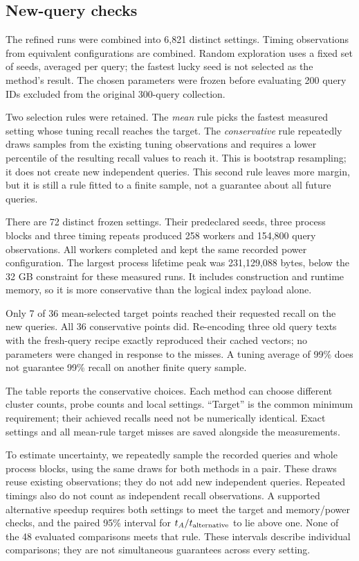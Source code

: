\subsection{New-query checks}
The refined runs were combined into 6,821 distinct settings. Timing observations from equivalent configurations are combined. Random exploration uses a fixed set of seeds, averaged per query;
the fastest lucky seed is not selected as the method's result. The chosen parameters were
frozen before evaluating 200 query IDs excluded from the original 300-query collection.

Two selection rules were retained. The \emph{mean} rule picks the fastest measured setting whose
tuning recall reaches the target. The \emph{conservative} rule repeatedly draws samples from the existing tuning observations
and requires a lower percentile of the resulting recall values to reach it. This is bootstrap
resampling; it does not create new independent queries. This second rule leaves more margin, but it is still
a rule fitted to a finite sample, not a guarantee about all future queries.

There are 72 distinct frozen settings. Their predeclared seeds, three process blocks and three
timing repeats produced 258 workers and 154,800 query observations. All workers completed and
kept the same recorded power configuration. The largest process lifetime peak was 231,129,088
bytes, below the 32 GB constraint for these measured runs. It includes construction and runtime
memory, so it is more conservative than the logical index payload alone.

Only 7 of 36 mean-selected target points reached their requested recall on the new queries.
All 36 conservative points did. Re-encoding three old query texts with the fresh-query recipe
exactly reproduced their cached vectors; no parameters were changed in response to the misses.
A tuning average of 99\% does not guarantee 99\% recall on another finite query sample.


The table reports the conservative choices. Each method can choose different cluster counts,
probe counts and local settings. ``Target'' is the common minimum requirement; their achieved
recalls need not be numerically identical. Exact settings and all mean-rule target misses are
saved alongside the measurements.

To estimate uncertainty, we repeatedly sample the recorded queries and whole process blocks,
using the same draws for both methods in a pair. These draws reuse existing observations;
they do not add new independent queries. Repeated timings also do not count as independent
recall observations.
A supported alternative speedup requires both settings to meet the target and memory/power
checks, and the paired 95\% interval for $t_A/t_{\rm alternative}$ to lie above one. None of the
48 evaluated comparisons meets that rule. These intervals describe individual comparisons;
they are not simultaneous guarantees across every setting.

